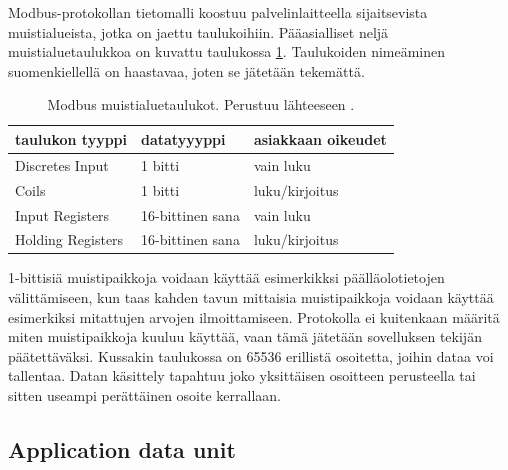   Modbus-protokollan tietomalli koostuu palvelinlaitteella sijaitsevista muistialueista, jotka on jaettu taulukoihiin. Pääasialliset neljä muistialuetaulukkoa on kuvattu taulukossa \ref{taulukot}. Taulukoiden nimeäminen suomenkiellellä on haastavaa, joten se jätetään tekemättä.
  \begin{table}[h]
    \centering
    \caption[Modbus muistialuetaulukot.]{Modbus muistialuetaulukot. Perustuu lähteeseen \parencite{modbusAppSpec}.}
    \begin{tabular}{|l|l|l|}
      \hline
      \rowcolor{gray} taulukon tyyppi         & datatyyyppi      & asiakkaan oikeudet  \\ \hline
      \cellcolor{lightgray}Discretes Input    & 1 bitti          & vain luku           \\ \hline
      \cellcolor{lightgray}Coils              & 1 bitti          & luku/kirjoitus      \\ \hline
      \cellcolor{lightgray}Input Registers    & 16-bittinen sana & vain luku           \\ \hline
      \cellcolor{lightgray}Holding Registers  & 16-bittinen sana & luku/kirjoitus      \\ \hline
    \end{tabular}
    \label{taulukot}
  \end{table}
  1-bittisiä muistipaikkoja voidaan käyttää esimerkikksi päälläolotietojen välittämiseen, kun taas kahden tavun mittaisia muistipaikkoja voidaan käyttää esimerkiksi mitattujen arvojen ilmoittamiseen. Protokolla ei kuitenkaan määritä miten muistipaikkoja kuuluu käyttää, vaan tämä jätetään sovelluksen tekijän päätettäväksi. Kussakin taulukossa on 65536 erillistä osoitetta, joihin dataa voi tallentaa. Datan käsittely tapahtuu joko yksittäisen osoitteen perusteella tai sitten useampi perättäinen osoite kerrallaan.\parencite{modbusAppSpec}

  \subsection{Application data unit}


